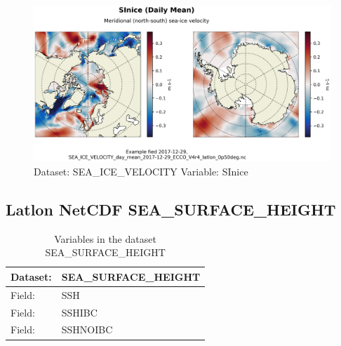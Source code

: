 \begin{figure}[H]
\centering
\includegraphics[scale=0.55]{../images/plots/latlon_plots/Sea-Ice_Velocity/SInice.png}
\caption{Dataset: SEA\_ICE\_VELOCITY Variable: SInice}
\label{tab:table-SEA_ICE_VELOCITY_SInice-Plot}
\end{figure}
\pagebreak
\subsection{Latlon NetCDF SEA\_SURFACE\_HEIGHT}
\newp
\begin{longtable}{|p{}|p{}|}
\caption{Variables in the dataset SEA\_SURFACE\_HEIGHT}
\label{tab:table-SEA_SURFACE_HEIGHT-fields} \\ 
\hline \endhead \hline \endfoot
\rowcolor{lightgray} \textbf{Dataset:} & \textbf{SEA\_SURFACE\_HEIGHT} \\ \hline
Field: &SSH \\ \hline
Field: &SSHIBC \\ \hline
Field: &SSHNOIBC \\ \hline
\end{longtable}

\pagebreak
